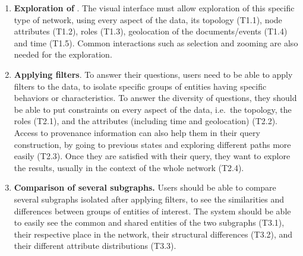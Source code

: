 \begin{enumerate}
    \item \textbf{Exploration of \modelplural}. The visual interface must allow exploration of this specific type of network, using every aspect of the data, \ie its topology (T1.1), node attributes  (T1.2), roles (T1.3), geolocation of the documents/events (T1.4) and time (T1.5).
    Common interactions such as selection and zooming are also needed for the exploration.
    \item \textbf{Applying filters}. To answer their questions, users need to be able to apply filters to the data, to isolate specific groups of entities having specific behaviors or characteristics. To answer the diversity of questions, they should be able to put constraints on every aspect of the data, i.e.\ the topology, the roles (T2.1), and the attributes (including time and geolocation) (T2.2).
    Access to provenance information can also help them in their query construction, by going to previous states and exploring different paths more easily (T2.3). Once they are satisfied with their query, they want to explore the results, usually in the context of the whole network (T2.4).
    \item \textbf{Comparison of several subgraphs.} Users should be able to compare several subgraphs isolated after applying filters, to see the similarities and differences between groups of entities of interest. The system should be able to easily see the common and shared entities of the two subgraphs (T3.1), their respective place in the network, their structural differences (T3.2), and their different attribute distributions (T3.3).
\end{enumerate}


